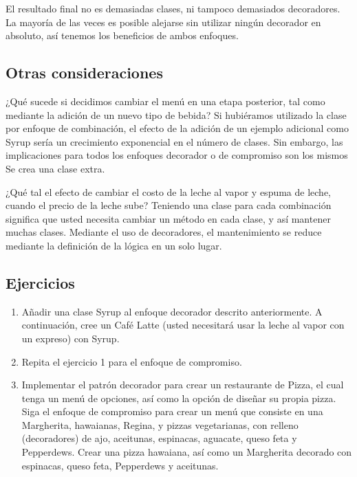 \documentclass{article}
\begin{document}
El resultado final no es demasiadas clases, ni tampoco demasiados decoradores. La mayoría de las veces es posible alejarse sin utilizar ningún decorador en absoluto, así tenemos los beneficios de ambos enfoques.     \newline

\subsection{Otras consideraciones}

¿Qué sucede si decidimos cambiar el menú en una etapa posterior, tal como mediante la adición de un nuevo tipo de bebida? Si hubiéramos utilizado la clase por enfoque de combinación, el efecto de la adición de un ejemplo adicional como Syrup sería un crecimiento exponencial en el número de clases. Sin embargo, las implicaciones para todos los enfoques decorador o de compromiso son los mismos \- Se crea una clase extra.    \newline

¿Qué tal el efecto de cambiar el costo de la leche al vapor y espuma de leche, cuando el precio de la leche sube? Teniendo una clase para cada combinación significa que usted necesita cambiar un método en cada clase, y así mantener muchas clases. Mediante el uso de decoradores, el mantenimiento se reduce mediante la definición de la lógica en un solo lugar.  \newline

\subsection{Ejercicios}
\begin{enumerate}[1.]
    \item Añadir una clase Syrup al enfoque decorador descrito anteriormente. A continuación, cree un Café Latte (usted necesitará usar la leche al vapor con un expreso) con Syrup.
    \item Repita el ejercicio 1 para el enfoque de compromiso.
    \item Implementar el patrón decorador para crear un restaurante de Pizza, el cual tenga un menú de opciones, así como la opción de diseñar su propia pizza. Siga el enfoque de compromiso para crear un menú que consiste en una Margherita, hawaianas, Regina, y pizzas vegetarianas, con relleno (decoradores) de ajo, aceitunas, espinacas, aguacate, queso feta y Pepperdews. Crear una pizza hawaiana, así como un Margherita decorado con espinacas, queso feta, Pepperdews y aceitunas.
\end{enumerate}
\end{document}
